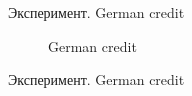\documentclass{beamer}
\begin{document}
\begin{frame}{Эксперимент. German credit}

\begin{figure}[H]
      \caption{German credit}
\end{figure}

\end{frame}

\begin{frame}{Эксперимент. German credit}


\end{frame}
\end{document}

